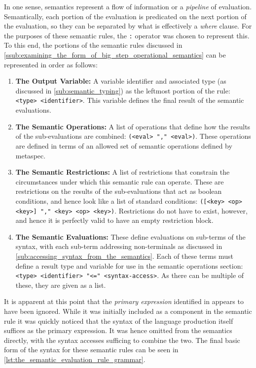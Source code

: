 In one sense, semantics represent a flow of information or a \textit{pipeline} of evaluation. 
Semantically, each portion of the evaluation is predicated on the next portion of the evaluation, so they can be separated by what is effectively a \textit{where} clause. 
For the purposes of these semantic rules, the \texttt{:} operator was chosen to represent this.
To this end, the portions of the semantic rules discussed in \autoref{ssub:examining_the_form_of_big_step_operational_semantics} can be represented in order as follows:
\begin{enumerate}
    \item \textbf{The Output Variable:} A variable identifier and associated type (as discussed in \autoref{sub:semantic_typing}) as the leftmost portion of the rule: \texttt{<type> <identifier>}.
    This variable defines the final result of the semantic evaluations.
    \item \textbf{The Semantic Operations:} A list of operations that define how the results of the sub-evaluations are combined: \texttt{(<eval> {"," <eval>})}.
    These operations are defined in terms of an allowed set of semantic operations defined by metaspec. %
    \item \textbf{The Semantic Restrictions:} A list of restrictions that constrain the circumstances under which this semantic rule can operate.
    These are restrictions on the results of the sub-evaluations that act as boolean conditions, and hence look like a list of standard conditions: \texttt{([<key> <op> <key>] {"," <key> <op> <key>})}.
    Restrictions do not have to exist, however, and hence it is perfectly valid to have an empty restriction block.
    \item \textbf{The Semantic Evaluations:} These define evaluations on sub-terms of the syntax, with each sub-term addressing non-terminals as discussed in \autoref{sub:accessing_syntax_from_the_semantics}. 
    Each of these terms must define a result type and variable for use in the semantic operations section: \texttt{<type> <identifier> "<=" <syntax-access>}.
    As there can be multiple of these, they are given as a list.
\end{enumerate}

It is apparent at this point that the \textit{primary expression} identified in appears to have been ignored.
While it was initially included as a component in the semantic rule it was quickly noticed that the syntax of the language production itself suffices as the primary expression.
It was hence omitted from the semantics directly, with the syntax accesses sufficing to combine the two. 
The final basic form of the syntax for these semantic rules can be seen in \autoref{lst:the_semantic_evaluation_rule_grammar}.

